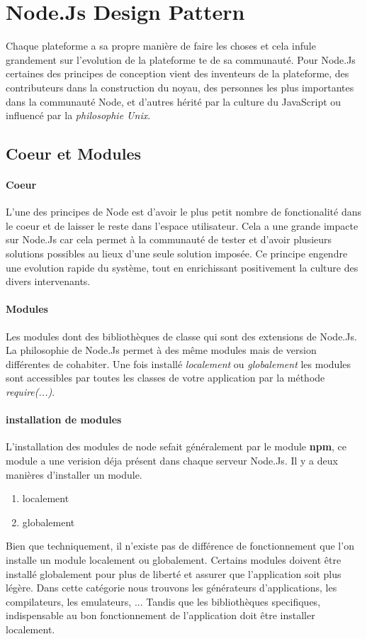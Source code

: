 \section{Node.Js Design Pattern}
Chaque plateforme a sa propre manière de faire les choses et cela infule grandement sur l'evolution de la plateforme te de sa communauté.
Pour Node.Js certaines des principes de conception vient des inventeurs de la plateforme, des contributeurs dans la construction du noyau, des personnes les plus importantes dans la communauté Node, et d'autres hérité par la culture du JavaScript ou influencé par la \textit{philosophie Unix}.
\subsection{Coeur et Modules}
\paragraph{Coeur}
L'une des principes de Node est d'avoir le plus petit nombre de fonctionalité dans le coeur et de laisser le reste dans l'espace utilisateur. Cela a une grande impacte sur Node.Js car cela permet à la communauté de tester et d'avoir plusieurs solutions possibles au lieux d'une seule solution imposée. Ce principe engendre une evolution rapide du système, tout en enrichissant positivement la culture des divers intervenants.
\paragraph{Modules}
Les modules dont des bibliothèques de classe qui sont des extensions de Node.Js. La philosophie de Node.Js permet à des même modules mais de version différentes de cohabiter. Une fois installé \textit{localement} ou \textit{globalement} les modules sont accessibles par toutes les classes de votre application par la méthode \textit{require(...)}.
\paragraph{installation de modules}
L'installation des modules de node sefait généralement par le module \textbf{npm}, ce module a une verision déja présent dans chaque serveur Node.Js.
Il y a deux manières d'installer un module.
\begin{enumerate}
	\item localement
	\item globalement
\end{enumerate}
Bien que techniquement, il n'existe pas de différence de fonctionnement que l'on installe un module localement ou globalement. Certains modules doivent être installé globalement pour plus de liberté et assurer que l'application soit plus légère. Dans cette catégorie nous trouvons les générateurs d'applications, les compilateurs, les emulateurs, ...
Tandis que les bibliothèques specifiques, indispensable au bon fonctionnement de l'application doit être installer localement.

